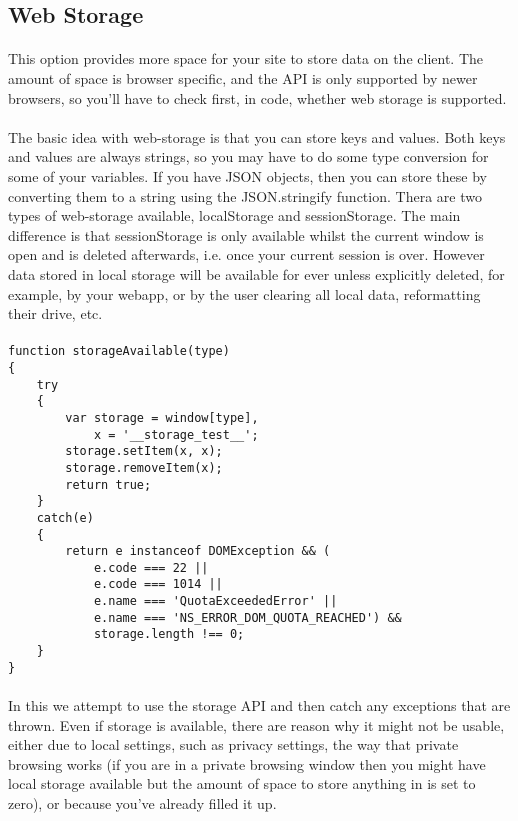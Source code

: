 \documentclass[10pt, a4paper]{article}
\begin{document}
\subsection*{Web Storage}

\paragraph{} This option provides more space for your site to store data on the client. The amount of space is browser specific, and the API is only supported by newer browsers, so you'll have to check first, in code, whether web storage is supported.

\paragraph{} The basic idea with web-storage is that you can store keys and values. Both keys and values are always strings, so you may have to do some type conversion for some of your variables. If you have JSON objects, then you can store these by converting them to a string using the JSON.stringify function. Thera are two types of web-storage available, localStorage and sessionStorage. The main difference is that sessionStorage is only available whilst the current window is open and is deleted afterwards, i.e. once your current session is over. However data stored in local storage will be available for ever unless explicitly deleted, for example, by your webapp, or by the user clearing all local data, reformatting their drive, etc.

\paragraph{} 

\begin{lstlisting}
function storageAvailable(type)
{
    try
    {
        var storage = window[type],
            x = '__storage_test__';
        storage.setItem(x, x);
        storage.removeItem(x);
        return true;
    }
    catch(e)
    {
        return e instanceof DOMException && (
            e.code === 22 ||
            e.code === 1014 ||
            e.name === 'QuotaExceededError' ||
            e.name === 'NS_ERROR_DOM_QUOTA_REACHED') &&
            storage.length !== 0;
    }
}
\end{lstlisting}
\paragraph{} In this we attempt to use the storage API and then catch any exceptions that are thrown. Even if storage is available, there are reason why it might not be usable, either due to local settings, such as privacy settings, the way that private browsing works (if you are in a private browsing window then you might have local storage available but the amount of space to store anything in is set to zero), or because you've already filled it up.
\end{document}
